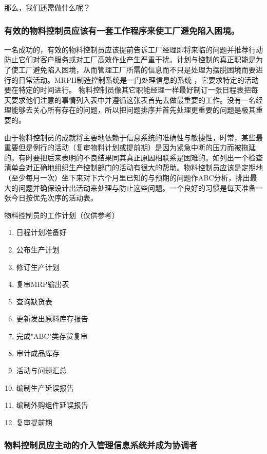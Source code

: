     那么，我们还需做什么呢？

\subsubsection {有效的物料控制员应该有一套工作程序来使工厂避免陷入困境。}

    一名成功的，有效的物料控制员应该提前告诉工厂经理即将来临的问题并推荐行动防止它们对客户服务或对工厂高效作业产生严重干扰。计划与控制的真正职能是为了使工厂避免陷入困境，从而管理工厂所需的信息而不只是处理为摆脱困境而要进行的日常活动。MRPII制造控制系统是一门处理信息的系统 ，它要求特定的活动要在特定的时间进行。 物料控制员像其它职能经理一样最好制订一张日程表把每天要求他们注意的事情列入表中并遵循这张表首先去做最重要的工作。没有一名经理能够去关心所有存在的问题，所以把问题排序并首先处理更重要的问题是极其重要的。

    由于物料控制员的成就将主要地依赖于信息系统的准确性与敏捷性，时常，某些最重要但是例行的活动（复审物料计划或提前期）是因为紧急中断的压力而被拖延的。有时要把后来表明的不良结果同其真正原因相联系是困难的。如列出一个检查清单会对正确地组织生产控制部门的活动有很大的帮助。物料控制员应该是定期地（至少每月一次）坐下来对下六个月里已知的与预期的问题作ABC分析，排出最大的问题并确保设计出活动来处理与防止这些问题。一个良好的习惯是每天准备一张今日按优先次序的活动表。

    物料控制员的工作计划（仅供参考）

    \begin{enumerate}
        \item  日程计划准备好
        \item  公布生产计划
        \item  修订生产计划
        \item  复审MRP输出表
        \item  查询缺货表
        \item  更新发出原料库存报告
        \item  完成"ABC"类存货复审
        \item  审计成品库存
        \item  活动与问题汇总
        \item  编制生产延误报告
        \item  编制外购组件延误报告
        \item  复审提前期
    \end{enumerate}

\subsubsection {物料控制员应主动的介入管理信息系统并成为协调者}

